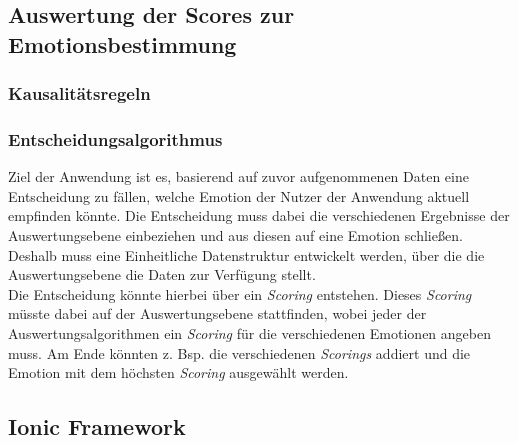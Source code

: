 \subsection{Auswertung der Scores zur Emotionsbestimmung}
\subsubsection{Kausalitätsregeln}
\subsubsection{Entscheidungsalgorithmus}
Ziel der Anwendung ist es, basierend auf zuvor aufgenommenen Daten eine Entscheidung zu fällen, welche Emotion der Nutzer der 
Anwendung aktuell empfinden könnte. Die Entscheidung muss dabei die verschiedenen Ergebnisse der Auswertungsebene einbeziehen
und aus diesen auf eine Emotion schließen. Deshalb muss eine Einheitliche Datenstruktur entwickelt werden, über die die Auswertungsebene
die Daten zur Verfügung stellt. \\
Die Entscheidung könnte hierbei über ein \textit{Scoring} entstehen. Dieses \textit{Scoring} müsste dabei auf der Auswertungsebene stattfinden, 
wobei jeder der Auswertungsalgorithmen ein \textit{Scoring} für die verschiedenen Emotionen angeben muss. Am Ende könnten z. Bsp. die verschiedenen 
\textit{Scorings} addiert und die Emotion mit dem höchsten \textit{Scoring} ausgewählt werden.
\subsection{Ionic Framework}
